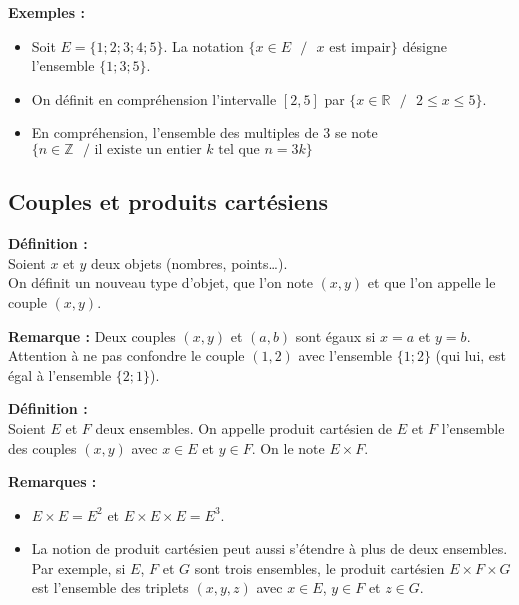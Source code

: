 \documentclass{article}
\begin{document}
\textbf{Exemples :}
\begin{itemize}
  \item Soit $E=\{1; 2; 3; 4; 5\}$. La notation $\{x\in E \text{ }/\text{ } x \text{ est impair}\}$ désigne l'ensemble $\{1; 3; 5\}$.
  \item On définit en compréhension l'intervalle $[2, 5]$ par $\{ x\in\mathbb{R} \text{ }/\text{ } 2 \leq x \leq 5 \}$.
  \item En compréhension, l'ensemble des multiples de $3$ se note $\{ n\in\mathbb{Z} \text{ }/\text{ il existe un entier $k$ tel que } n=3k\}$
\end{itemize}

\subsection{Couples et produits cartésiens}

\begin{mdframed}[style=definitionStyle]
    \textbf{Définition :} ~\\
    Soient $x$ et $y$ deux objets (nombres, points\dots).\\
    On définit un nouveau type d'objet, que l'on note $(x,y)$ et que l'on appelle le couple $(x,y)$.
\end{mdframed}

\textbf{Remarque :} Deux couples $(x,y)$ et $(a,b)$ sont égaux si $x=a$ et $y=b$. Attention à ne pas confondre le couple
$(1,2)$ avec l'ensemble $\{1;2\}$ (qui lui, est égal à l'ensemble $\{ 2;1 \}$).

\begin{mdframed}[style=definitionStyle]
    \textbf{Définition :} ~\\
    Soient $E$ et $F$ deux ensembles. On appelle produit cartésien de $E$ et $F$ l'ensemble des couples $(x,y)$ avec
    $x\in E$ et $y\in F$. On le note $E\times F$.
\end{mdframed}

\textbf{Remarques :}
\begin{itemize}
  \item $E\times E = E^2$ et $E\times E\times E = E^3$.
  \item La notion de produit cartésien peut aussi s'étendre à plus de deux ensembles. Par exemple, si $E$, $F$ et $G$
  sont trois ensembles, le produit cartésien $E\times F\times G$ est l'ensemble des triplets $(x, y, z)$ avec $x\in E$,
  $y\in F$ et $z\in G$.
\end{itemize}
\end{document}
